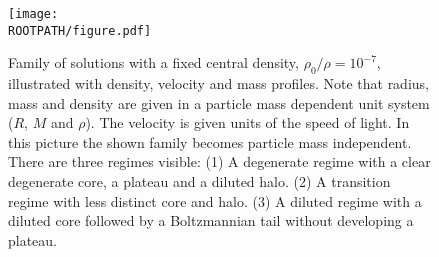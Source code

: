 \begin{figure}%
	\centering%
	\texttt{[image: \\ROOTPATH/figure.pdf]}
	\caption{Family of solutions with a fixed central density, $\rho_0/\rho = 10^{-7}$, illustrated with density, velocity and mass profiles. Note that radius, mass and density are given in a particle mass dependent unit system ($R$, $M$ and $\rho$). The velocity is given units of the speed of light. In this picture the shown family becomes particle mass independent. There are three regimes visible: (1) A degenerate regime with a clear degenerate core, a plateau and a diluted halo. (2) A transition regime with less distinct core and halo. (3) A diluted regime with a diluted core followed by a Boltzmannian tail without developing a plateau.}%
	\label{fig:profiles:without-cutoff:central-density:raw}%
\end{figure}